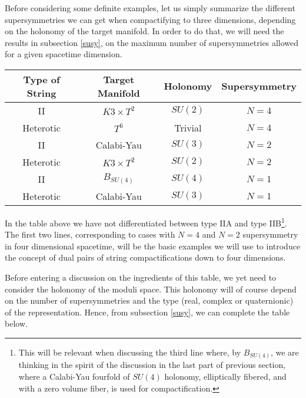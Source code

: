 Before considering some definite examples, let us simply
summarize the different supersymmetries we can get when
compactifying to three dimensions, depending on the holonomy of
the target manifold. In order to do that, we will need the results 
in subsection \ref{susy}, on the maximum number of
supersymmetries allowed for a given spacetime dimension.

\begin{center}

\begin{tabular}{|c|c|c|c|}     \hline\hline
	 {\bf Type of String}   & {\bf Target Manifold} & {\bf Holonomy} & {\bf Supersymmetry}  \\ \hline
	 II                     & $K3\times T^2$        & $SU(2)$        & $N\!=\!4$   \\
	 Heterotic              & $T^6$                 & Trivial        & $N\!=\!4$   \\ \hline
	 II                     & Calabi-Yau            & $SU(3)$        & $N\!=\!2$   \\
	 Heterotic              & $K3\times T^2$        & $SU(2)$        & $N\!=\!2$   \\ \hline
	 II                     & $B_{SU(4)}$           & $SU(4)$        & $N\!=\!1$   \\
	 Heterotic              & Calabi-Yau            & $SU(3)$        & $N\!=\!1$   \\ \hline\hline

\end{tabular}
\label{tab:sc}
\end{center}

In the table above we have not differentiated between type IIA
and type IIB\footnote{This will be relevant when discussing the third
line where, by $B_{SU(4)}$, we are thinking in the spirit of the
discussion in the last part of previous section, where a
Calabi-Yau fourfold of $SU(4)$ holonomy, elliptically fibered,
and with a zero volume fiber, is used for compactification.}. The
first two lines, corresponding to cases with $N\!=\!4$ and
$N\!=\!2$ supersymmetry in four dimensional spacetime, will be the
basic examples we will use to introduce the concept of dual pairs
of string compactifications down to four dimensions.
  
Before entering a discussion on the ingredients of this table, 
we yet need to consider the holonomy of the moduli
space. This holonomy will of course depend on the number of
supersymmetries and the type (real, complex or quaternionic) of
the representation. Hence, from subsection \ref{susy}, we can complete 
the table below.


